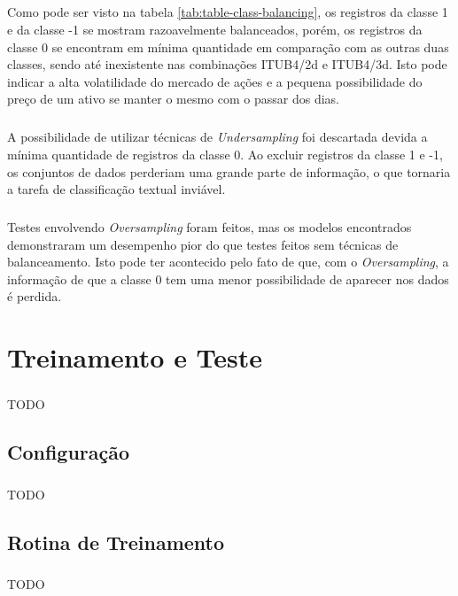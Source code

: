 \documentclass[grad,numbers]{coppe}
\begin{document}
  		\paragraph{}Como pode ser visto na tabela \ref{tab:table-class-balancing}, os registros da classe 1 e da classe -1 se mostram razoavelmente balanceados, porém, os registros da classe 0 se encontram em mínima quantidade em comparação com as outras duas classes, sendo até inexistente nas combinações ITUB4/2d e ITUB4/3d. Isto pode indicar a alta volatilidade do mercado de ações e a pequena possibilidade do preço de um ativo se manter o mesmo com o passar dos dias.
  		\paragraph{}A possibilidade de utilizar técnicas de \textit{Undersampling} foi descartada devida a mínima quantidade de registros da classe 0. Ao excluir registros da classe 1 e -1, os conjuntos de dados perderiam uma grande parte de informação, o que tornaria a tarefa de classificação textual inviável.
  		\paragraph{}Testes envolvendo \textit{Oversampling} foram feitos, mas os modelos encontrados demonstraram um desempenho pior do que testes feitos sem técnicas de balanceamento. Isto pode ter acontecido pelo fato de que, com o \textit{Oversampling}, a informação de que a classe 0 tem uma menor possibilidade de aparecer nos dados é perdida.
  		
  \chapter{Treinamento e Teste}
	  \paragraph{}TODO
	  \section{Configuração}
		  \paragraph{}TODO
  	\section{Rotina de Treinamento}
  		\paragraph{}TODO
\end{document}
